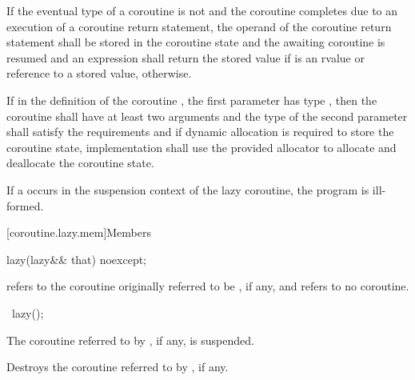 {\pnum
If the eventual type of a coroutine  is not  and the coroutine completes due to an execution of a coroutine return statement, the operand of the coroutine return statement shall be stored in the coroutine state and the awaiting coroutine  is resumed and an expression  shall return the stored value if  is an rvalue or reference to a stored value, otherwise.

\pnum
If in the definition of the coroutine , the first parameter has type , then the coroutine shall have at least two arguments and the type of the second parameter shall satisfy the  requirements and if dynamic allocation is required to store the coroutine state, implementation shall use the provided allocator to allocate and deallocate the coroutine state.

\pnum
If a  occurs
in the suspension context of the lazy coroutine,
the program is ill-formed.

[coroutine.lazy.mem]{Members}
\begin{itemdecl}
lazy(lazy&& that) noexcept;
\end{itemdecl}

\begin{itemdescr}
\pnum
\ensures
{} refers to the coroutine
originally referred to be , if any,
and  refers to no coroutine.
\end{itemdescr}

\begin{itemdecl}
~lazy();
\end{itemdecl}

\begin{itemdescr}
\pnum
\expects
The coroutine referred to by , if any, is suspended.

\pnum
\effects
Destroys the coroutine referred to by , if any.
\end{itemdescr}
} %
